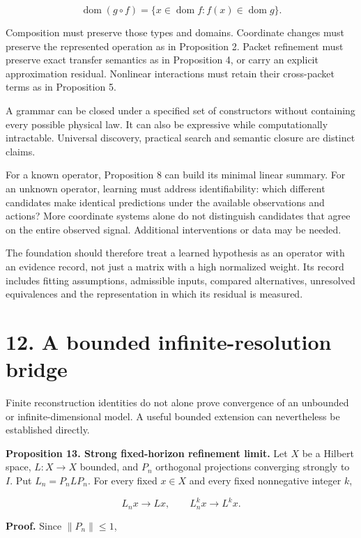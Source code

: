 \documentclass[11pt,letterpaper]{article}
\begin{document}
\[
\operatorname{dom}(g\circ f)
=\{x\in\operatorname{dom}f:f(x)\in\operatorname{dom}g\}.
\]

Composition must preserve those types and domains. Coordinate changes
must preserve the represented operation as in Proposition 2. Packet
refinement must preserve exact transfer semantics as in Proposition 4,
or carry an explicit approximation residual. Nonlinear interactions must
retain their cross-packet terms as in Proposition 5.

A grammar can be closed under a specified set of constructors without
containing every possible physical law. It can also be expressive while
computationally intractable. Universal discovery, practical search and
semantic closure are distinct claims.

For a known operator, Proposition 8 can build its minimal linear
summary. For an unknown operator, learning must address identifiability:
which different candidates make identical predictions under the
available observations and actions? More coordinate systems alone do not
distinguish candidates that agree on the entire observed signal.
Additional interventions or data may be needed.

The foundation should therefore treat a learned hypothesis as an
operator with an evidence record, not just a matrix with a high
normalized weight. Its record includes fitting assumptions, admissible
inputs, compared alternatives, unresolved equivalences and the
representation in which its residual is measured.

\section{12. A bounded infinite-resolution
bridge}\label{a-bounded-infinite-resolution-bridge}

Finite reconstruction identities do not alone prove convergence of an
unbounded or infinite-dimensional model. A useful bounded extension can
nevertheless be established directly.

\textbf{Proposition 13. Strong fixed-horizon refinement limit.} Let
\(X\) be a Hilbert space, \(L:X\to X\) bounded, and \(P_n\) orthogonal
projections converging strongly to \(I\). Put \(L_n=P_nLP_n\). For every
fixed \(x\in X\) and every fixed nonnegative integer \(k\),

\[
L_nx\longrightarrow Lx,\qquad
L_n^kx\longrightarrow L^kx.
\]

\textbf{Proof.} Since \(\|P_n\|\leq1\),
\end{document}
